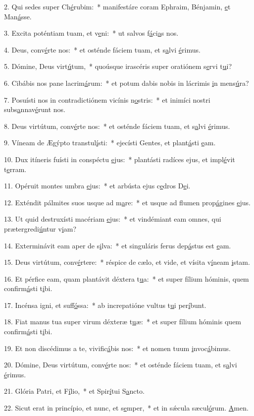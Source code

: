 2. Qui sedes super Ch\uline{é}rubim:~* manifestáre coram Ephraim, Bénjamin, \uline{e}t Man\uline{á}sse.\par 
3. Excita poténtiam tuam, et v\uline{e}ni:~* ut salvos f\uline{á}ci\uline{a}s nos.\par 
4. Deus, conv\uline{é}rte nos:~* et osténde fáciem tuam, et s\uline{a}lvi \uline{é}rimus.\par 
5. Dómine, Deus virt\uline{ú}tum,~* quoúsque irascéris super oratiónem s\uline{e}rvi t\uline{u}i?\par 
6. Cibábis nos pane lacrim\uline{á}rum:~* et potum dabis nobis in lácrimis \uline{i}n mens\uline{ú}ra?\par 
7. Posuísti nos in contradictiónem vicínis n\uline{o}stris:~* et inimíci nostri subs\uline{a}nnav\uline{é}runt nos.\par 
8. Deus virtútum, conv\uline{é}rte nos:~* et osténde fáciem tuam, et s\uline{a}lvi \uline{é}rimus.\par 
9. Víneam de Ægýpto transtul\uline{í}sti:~* ejecísti Gentes, et plant\uline{á}sti \uline{e}am.\par 
10. Dux itíneris fuísti in conspéctu \uline{e}jus:~* plantásti radíces ejus, et impl\uline{é}vit t\uline{e}rram.\par 
11. Opéruit montes umbra \uline{e}jus:~* et arbústa ejus c\uline{e}dros D\uline{e}i.\par 
12. Exténdit pálmites suos usque ad m\uline{a}re:~* et usque ad flumen prop\uline{á}gines \uline{e}jus.\par 
13. Ut quid destruxísti macériam \uline{e}jus:~* et vindémiant eam omnes, qui prætergredi\uline{ú}ntur v\uline{i}am?\par 
14. Exterminávit eam aper de s\uline{i}lva:~* et singuláris ferus dep\uline{á}stus est \uline{e}am.\par 
15. Deus virtútum, conv\uline{é}rtere:~* réspice de cælo, et vide, et vísita v\uline{í}neam \uline{i}stam.\par 
16. Et pérfice eam, quam plantávit déxtera t\uline{u}a:~* et super fílium hóminis, quem confirm\uline{á}sti t\uline{i}bi.\par 
17. Incénsa igni, et suff\uline{ó}ssa:~* ab increpatióne vultus t\uline{u}i per\uline{í}bunt.\par 
18. Fiat manus tua super virum déxteræ t\uline{u}æ:~* et super fílium hóminis quem confirm\uline{á}sti t\uline{i}bi.\par 
19. Et non discédimus a te, vivific\uline{á}bis nos:~* et nomen tuum \uline{i}nvoc\uline{á}bimus.\par 
20. Dómine, Deus virtútum, conv\uline{é}rte nos:~* et osténde fáciem tuam, et s\uline{a}lvi \uline{é}rimus.\par 
21. Glória Patri, et F\uline{í}lio,~* et Spir\uline{í}tui S\uline{a}ncto.\par 
22. Sicut erat in princípio, et nunc, et s\uline{e}mper,~* et in sǽcula sæcul\uline{ó}rum. \uline{A}men.\par 
